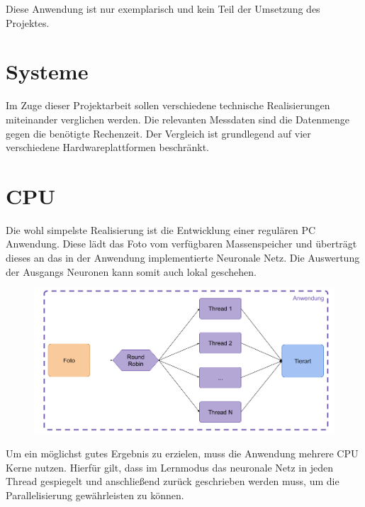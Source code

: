 Diese Anwendung ist nur exemplarisch und kein Teil der Umsetzung des Projektes.

\newpage


\section{Systeme}

Im Zuge dieser Projektarbeit sollen verschiedene technische Realisierungen miteinander verglichen werden. Die relevanten Messdaten sind die Datenmenge gegen die benötigte Rechenzeit. Der Vergleich ist grundlegend auf vier verschiedene Hardwareplattformen beschränkt.



\section{CPU}

Die wohl simpelste Realisierung ist die Entwicklung einer regulären PC Anwendung. Diese lädt das Foto vom verfügbaren Massenspeicher und überträgt dieses an das in der Anwendung implementierte Neuronale Netz. Die Auswertung der Ausgangs Neuronen kann somit auch lokal geschehen. 

\begin{figure}[htbp]
	\centering
		\includegraphics[width=1.00\textwidth]{BilderPDF/zielsetzung/System-PC.png}
	\label{fig:System-PC}
\end{figure}

Um ein möglichst gutes Ergebnis zu erzielen, muss die Anwendung mehrere CPU Kerne nutzen. Hierfür gilt, dass im Lernmodus das neuronale Netz in jeden Thread gespiegelt und anschließend zurück geschrieben werden muss, um die Parallelisierung gewährleisten zu können.\\


